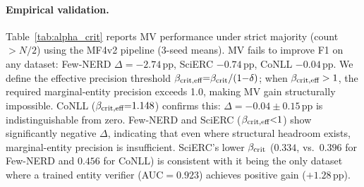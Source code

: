 \paragraph{Empirical validation.}
Table~\ref{tab:alpha_crit} reports MV performance under strict majority (count $> N/2$) using the MF4v2 pipeline (3-seed means).
MV fails to improve F1 on any dataset: Few-NERD $\Delta{=}{-}2.74$\,pp, SciERC $-0.74$\,pp, CoNLL $-0.04$\,pp.
We define the effective precision threshold $\beta_{\textup{crit,eff}} {=} \beta_{\textup{crit}} / (1{-}\delta)$; when $\beta_{\textup{crit,eff}} > 1$, the required marginal-entity precision exceeds 1.0, making MV gain structurally impossible.
CoNLL ($\beta_{\textup{crit,eff}}{=}1.148$) confirms this: $\Delta{=}{-}0.04{\pm}0.15$\,pp is indistinguishable from zero.
Few-NERD and SciERC ($\beta_{\textup{crit,eff}} {<} 1$) show significantly negative $\Delta$, indicating that even where structural headroom exists, marginal-entity precision is insufficient.
SciERC's lower $\beta_{\textup{crit}}$ ($0.334$, vs.\ $0.396$ for Few-NERD and $0.456$ for CoNLL) is consistent with it being the only dataset where a trained entity verifier (AUC${=}0.923$) achieves positive gain ($+1.28$\,pp).

\begin{table}[h]
\centering\small
\caption{MV performance under strict majority (count $> N/2$; Qwen3-8B FT, $N{=}8$, $T{=}1.0$, 3-seed mean${\pm}\sigma$). $\beta_{\textup{crit}} = F_1^{\textup{gr}}/2$; $\beta_{\textup{crit,eff}} = \beta_{\textup{crit}} / (1{-}\delta)$. When $\beta_{\textup{crit,eff}} > 1$, MV gain is structurally impossible.}
\label{tab:alpha_crit}

\end{table}


